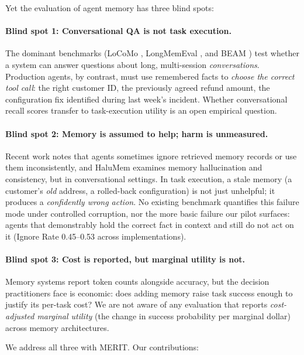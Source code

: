 \documentclass[11pt]{article}
\newcommand{\merit}{\textsc{MERIT}}
\begin{document}
Yet the evaluation of agent memory has three blind spots:

\paragraph{Blind spot 1: Conversational QA is not task execution.}
The dominant benchmarks (LoCoMo \citep{locomo}, LongMemEval \citep{longmemeval},
and BEAM \citep{beam}) test whether a system can answer questions about
long, multi-session \emph{conversations}. Production agents, by contrast,
must use remembered facts to \emph{choose the correct tool call}: the right
customer ID, the previously agreed refund amount, the configuration fix
identified during last week's incident. Whether conversational recall scores
transfer to task-execution utility is an open empirical question.

\paragraph{Blind spot 2: Memory is assumed to help; harm is unmeasured.}
Recent work notes that agents sometimes ignore retrieved memory records or
use them inconsistently, and HaluMem \citep{halumem} examines memory
hallucination and consistency, but in conversational settings. In task
execution, a stale memory (a customer's \emph{old} address, a rolled-back
configuration) is not just unhelpful; it produces a \emph{confidently wrong
action}. No existing benchmark quantifies this failure mode under controlled
corruption, nor the more basic failure our pilot surfaces: agents that
demonstrably hold the correct fact in context and still do not act on it
(Ignore Rate 0.45--0.53 across implementations).

\paragraph{Blind spot 3: Cost is reported, but marginal utility is not.}
Memory systems report token counts alongside accuracy, but the decision
practitioners face is economic: does adding memory raise task success enough
to justify its per-task cost? We are not aware of any evaluation that reports
\emph{cost-adjusted marginal utility} (the change in success probability per
marginal dollar) across memory architectures.

We address all three with \merit{}. Our contributions:
\end{document}
